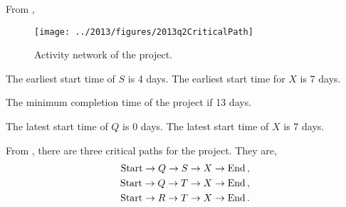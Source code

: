 %
%

\begin{subquestions}


\subquestion

From ,
\begin{figure}
	\begin{center}
		\texttt{[image: ../2013/figures/2013q2CriticalPath]}
		\caption{\label{2013:q2:fig:ActNet} Activity network of the project.}
	\end{center}
\end{figure}




\begin{subsubquestions}

\subsubquestion 

The earliest start time of $S$ is 4 days. The earliest start time for $X$ is 7 days.


\subsubquestion

The minimum completion time of the project if 13 days.


\subsubquestion

The latest start time of $Q$ is 0 days. The latest start time of $X$ is 7 days.


\subsubquestion

From , there are three critical paths for the project. They are,
\begin{align}
	\text{Start} \rightarrow Q \rightarrow S \rightarrow X \rightarrow \text{End}\,, \nonumber \\
	\text{Start} \rightarrow Q \rightarrow T \rightarrow X \rightarrow \text{End}\,, \nonumber \\
	\text{Start} \rightarrow R \rightarrow T \rightarrow X \rightarrow \text{End}\,.
\end{align}


\end{subsubquestions}
\end{subquestions}
